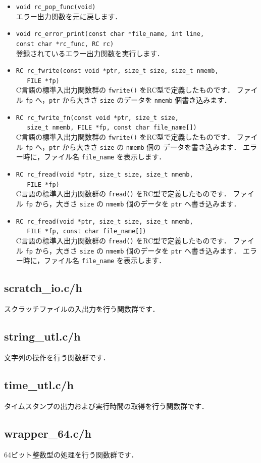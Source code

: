 \begin{itemize}
\item \verb|void rc_pop_func(void)| \ \\
エラー出力関数を元に戻します．

\item \verb|void rc_error_print(const char *file_name, int line, | \\
	\verb|const char *rc_func, RC rc)| \ \\
登録されているエラー出力関数を実行します．

\item \verb|RC rc_fwrite(const void *ptr, size_t size, size_t nmemb, | \\
	\verb|   FILE *fp)| \ \\
C言語の標準入出力関数群の \verb|fwrite()| をRC型で定義したものです．
ファイル \verb|fp| へ，\verb|ptr| から大きさ \verb|size| のデータを
\verb|nmemb| 個書き込みます．

\item \verb|RC rc_fwrite_fn(const void *ptr, size_t size, | \\
	\verb|   size_t nmemb, FILE *fp, const char file_name[])| \ \\
C言語の標準入出力関数群の \verb|fwrite()| をRC型で定義したものです．
ファイル \verb|fp| へ，\verb|ptr| から大きさ \verb|size| の \verb|nmemb| 個の
データを書き込みます．
エラー時に，ファイル名 \verb|file_name| を表示します．

\item \verb|RC rc_fread(void *ptr, size_t size, size_t nmemb, | \\
	\verb|   FILE *fp)| \ \\
C言語の標準入出力関数群の \verb|fread()| をRC型で定義したものです．
ファイル \verb|fp| から，大きさ \verb|size| の \verb|nmemb| 個のデータを
\verb|ptr| へ書き込みます．

\item \verb|RC rc_fread(void *ptr, size_t size, size_t nmemb, | \\
	\verb|   FILE *fp, const char file_name[])| \ \\
C言語の標準入出力関数群の \verb|fread()| をRC型で定義したものです．
ファイル \verb|fp| から，大きさ \verb|size| の \verb|nmemb| 個のデータを
\verb|ptr| へ書き込みます．
エラー時に，ファイル名 \verb|file_name| を表示します．

\end{itemize}

\subsection{scratch\_io.c/h}
スクラッチファイルの入出力を行う関数群です．

\subsection{string\_utl.c/h}
文字列の操作を行う関数群です．

\subsection{time\_utl.c/h}
タイムスタンプの出力および実行時間の取得を行う関数群です．

\subsection{wrapper\_64.c/h}
64ビット整数型の処理を行う関数群です．



